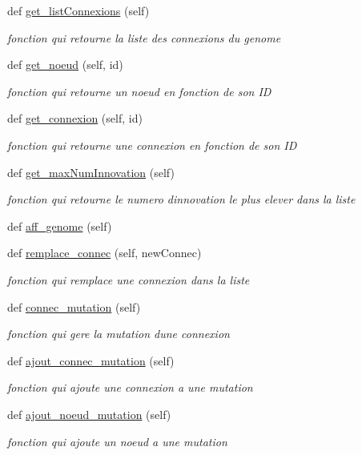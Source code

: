 \begin{DoxyCompactItemize}
def \hyperlink{classsrc_1_1genome_1_1_genome_a9ea67dd37797ab0f058d240eadec28f1}{get\+\_\+list\+Connexions} (self)
\begin{DoxyCompactList}\small\item\em fonction qui retourne la liste des connexions du genome \end{DoxyCompactList}\item 
def \hyperlink{classsrc_1_1genome_1_1_genome_a1e1498d4a1e288201aebca5bfeb38c40}{get\+\_\+noeud} (self, id)
\begin{DoxyCompactList}\small\item\em fonction qui retourne un noeud en fonction de son ID \end{DoxyCompactList}\item 
def \hyperlink{classsrc_1_1genome_1_1_genome_a437bce286bd8650178511ab8f0b6e136}{get\+\_\+connexion} (self, id)
\begin{DoxyCompactList}\small\item\em fonction qui retourne une connexion en fonction de son ID \end{DoxyCompactList}\item 
def \hyperlink{classsrc_1_1genome_1_1_genome_aa63fcd0ecdbe1d09b03923345ccc2905}{get\+\_\+max\+Num\+Innovation} (self)
\begin{DoxyCompactList}\small\item\em fonction qui retourne le numero d\textquotesingle{}innovation le plus elever dans la liste \end{DoxyCompactList}\item 
def \hyperlink{classsrc_1_1genome_1_1_genome_a3063702f4583662cebbed8dab1fdddce}{aff\+\_\+genome} (self)
\item 
def \hyperlink{classsrc_1_1genome_1_1_genome_a8bd17817c6103d0b9b6ab8ed95352b16}{remplace\+\_\+connec} (self, new\+Connec)
\begin{DoxyCompactList}\small\item\em fonction qui remplace une connexion dans la liste \end{DoxyCompactList}\item 
def \hyperlink{classsrc_1_1genome_1_1_genome_a9ead2052440838c9ae62fb4941307dca}{connec\+\_\+mutation} (self)
\begin{DoxyCompactList}\small\item\em fonction qui gere la mutation d\textquotesingle{}une connexion \end{DoxyCompactList}\item 
def \hyperlink{classsrc_1_1genome_1_1_genome_abbf59b4f5f026ede35169b71424f50de}{ajout\+\_\+connec\+\_\+mutation} (self)
\begin{DoxyCompactList}\small\item\em fonction qui ajoute une connexion a une mutation \end{DoxyCompactList}\item 
def \hyperlink{classsrc_1_1genome_1_1_genome_a2d7eb3874592319e992fcaf3de5a2cc3}{ajout\+\_\+noeud\+\_\+mutation} (self)
\begin{DoxyCompactList}\small\item\em fonction qui ajoute un noeud a une mutation \end{DoxyCompactList}\end{DoxyCompactItemize}
